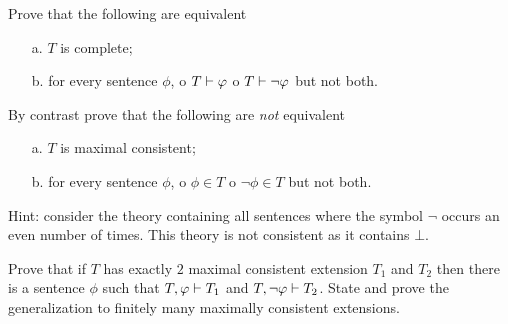 \documentclass[creche.tex]{subfiles}
\begin{document}
\begin{exercise}
Prove that the following are equivalent
\begin{itemize}
\item[a.] $T$ is complete;
\item[b.] for every sentence $\phi$, o $T\vdash\varphi$ o  $T\vdash\neg\varphi$ but not both.
\end{itemize}
By contrast prove that the following are \textit{not\/} equivalent
\begin{itemize}
\item[a.] $T$ is maximal consistent;
\item[b.] for every sentence $\phi$, o $\phi\in T$ o  $\neg\phi\in T$ but not both.
\end{itemize}
Hint: consider the theory containing all sentences where the symbol $\neg$ occurs an even number of times.
This theory is not consistent as it contains $\bot$.\QED
\end{exercise}

\begin{exercise}
Prove that if $T$ has exactly $2$ maximal consistent extension $T_1$ and $T_2$ then there is a sentence $\phi$ such that $T,\varphi\vdash T_1$ and $T,\neg\varphi\vdash T_2$.
State and prove the generalization to finitely many maximally consistent extensions.\QED
\end{exercise} 
\end{document}

